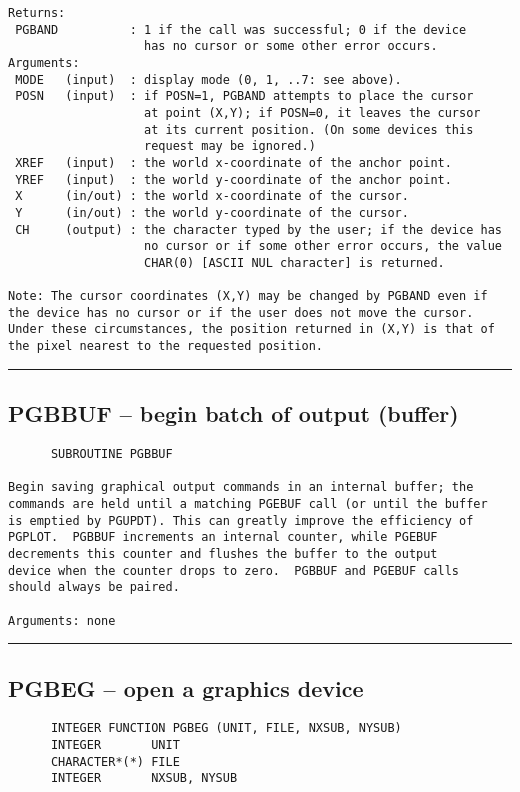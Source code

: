 {\begin{verbatim}
Returns:
 PGBAND          : 1 if the call was successful; 0 if the device
                   has no cursor or some other error occurs.
Arguments:
 MODE   (input)  : display mode (0, 1, ..7: see above).
 POSN   (input)  : if POSN=1, PGBAND attempts to place the cursor
                   at point (X,Y); if POSN=0, it leaves the cursor
                   at its current position. (On some devices this
                   request may be ignored.)
 XREF   (input)  : the world x-coordinate of the anchor point.
 YREF   (input)  : the world y-coordinate of the anchor point.
 X      (in/out) : the world x-coordinate of the cursor.
 Y      (in/out) : the world y-coordinate of the cursor.
 CH     (output) : the character typed by the user; if the device has
                   no cursor or if some other error occurs, the value
                   CHAR(0) [ASCII NUL character] is returned.

Note: The cursor coordinates (X,Y) may be changed by PGBAND even if
the device has no cursor or if the user does not move the cursor.
Under these circumstances, the position returned in (X,Y) is that of
the pixel nearest to the requested position.
\end{verbatim}
\hrule


\subsection*{PGBBUF -- begin batch of output (buffer) }
\begin{verbatim}
      SUBROUTINE PGBBUF

Begin saving graphical output commands in an internal buffer; the
commands are held until a matching PGEBUF call (or until the buffer
is emptied by PGUPDT). This can greatly improve the efficiency of
PGPLOT.  PGBBUF increments an internal counter, while PGEBUF
decrements this counter and flushes the buffer to the output
device when the counter drops to zero.  PGBBUF and PGEBUF calls
should always be paired.

Arguments: none
\end{verbatim}
\hrule


\subsection*{PGBEG -- open a graphics device }
\begin{verbatim}
      INTEGER FUNCTION PGBEG (UNIT, FILE, NXSUB, NYSUB)
      INTEGER       UNIT
      CHARACTER*(*) FILE
      INTEGER       NXSUB, NYSUB


\end{verbatim}}
